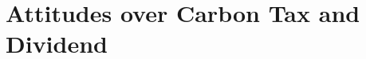 \documentclass[english,5p,authoryear]{elsarticle}
\begin{document}



\section{Attitudes over Carbon Tax and Dividend} \label{sec:attitudes_carbon_tax}


\end{document}
